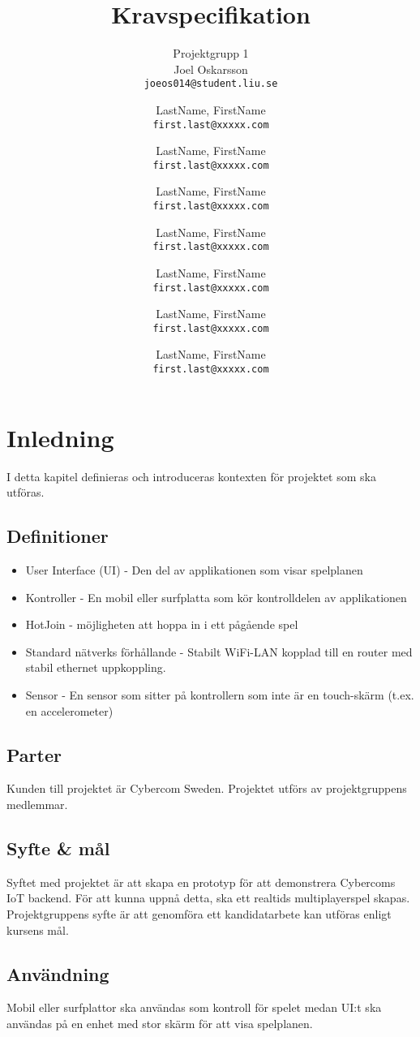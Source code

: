 \documentclass[10pt]{article}
\title{Kravspecifikation}
\author{
	Projektgrupp 1\\
	Joel Oskarsson\\
	\texttt{joeos014@student.liu.se}
	\and
	LastName, FirstName\\
	\texttt{first.last@xxxxx.com}
	\and
	LastName, FirstName\\
	\texttt{first.last@xxxxx.com}
	\and
	LastName, FirstName\\
	\texttt{first.last@xxxxx.com}
	\and
	LastName, FirstName\\
	\texttt{first.last@xxxxx.com}
  	\and
  	LastName, FirstName\\
  	\texttt{first.last@xxxxx.com}
  	\and
  	LastName, FirstName\\
  	\texttt{first.last@xxxxx.com}
  	\and
  	LastName, FirstName\\
  	\texttt{first.last@xxxxx.com}
}
\begin{document}
\maketitle
\pagebreak
\tableofcontents
\pagebreak
\section{Inledning}
	I detta kapitel definieras och introduceras kontexten för projektet som ska utföras.

	\subsection{Definitioner}
		\begin{itemize}
		\item User Interface (UI) - Den del av applikationen som visar spelplanen
		\item Kontroller - En mobil eller surfplatta som kör kontrolldelen av applikationen
		\item HotJoin - möjligheten att hoppa in i ett pågående spel
		\item Standard nätverks förhållande - Stabilt WiFi-LAN kopplad till en router med stabil ethernet uppkoppling.
		\item Sensor - En sensor som sitter på kontrollern som inte är en touch-skärm (t.ex. en accelerometer)
		\end{itemize}	

	\subsection{Parter}
	Kunden till projektet är Cybercom Sweden. Projektet utförs av projektgruppens medlemmar.
	\subsection{Syfte \& mål}
		Syftet med projektet är att skapa en prototyp för att demonstrera Cybercoms IoT backend. För att kunna uppnå detta, ska ett realtids multiplayerspel skapas. Projektgruppens syfte är att genomföra ett kandidatarbete kan utföras enligt kursens mål.
	
	\subsection{Användning}
		Mobil eller surfplattor ska användas som kontroll för spelet medan UI:t ska användas på en enhet med stor skärm för att visa spelplanen.
	
\end{document}
